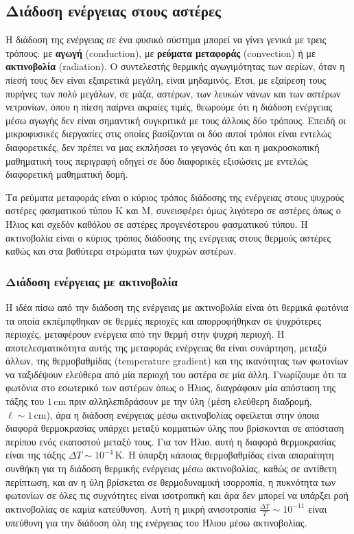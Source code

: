 \subsection{Διάδοση ενέργειας στους αστέρες}
Η διάδοση της ενέργειας σε ένα φυσικό σύστημα μπορεί να γίνει γενικά με τρεις τρόπους: με \textbf{αγωγή} (conduction), με \textbf{ρεύματα μεταφοράς} (convection) ή με \textbf{ακτινοβολία} (radiation). Ο συντελεστής θερμικής αγωγιμότητας των αερίων, όταν η πίεσή τους δεν είναι εξαιρετικά μεγάλη, είναι μηδαμινός. Έτσι, με εξαίρεση τους πυρήνες των πολύ μεγάλων, σε μάζα, αστέρων, των λευκών νάνων και των αστέρων νετρονίων, όπου η πίεση παίρνει ακραίες τιμές, θεωρούμε ότι η διάδοση ενέργειας μέσω αγωγής δεν είναι σημαντική συγκριτικά με τους άλλους δύο τρόπους. Επειδή οι μικροφυσικές διεργασίες στις οποίες βασίζονται οι δύο αυτοί τρόποι είναι εντελώς διαφορετικές, δεν πρέπει να μας εκπλήσσει το γεγονός ότι και η μακροσκοπική μαθηματική τους περιγραφή οδηγεί σε δύο διαφορικές εξισώσεις με εντελώς διαφορετική μαθηματική δομή.

Τα ρεύματα μεταφοράς είναι ο κύριος τρόπος διάδοσης της ενέργειας στους ψυχρούς αστέρες φασματικού τύπου Κ και Μ, συνεισφέρει όμως λιγότερο σε αστέρες όπως ο Ήλιος και σχεδόν καθόλου σε αστέρες προγενέστερου φασματικού τύπου. Η ακτινοβολία είναι ο κύριος τρόπος διάδοσης της ενέργειας στους θερμούς αστέρες καθώς και στα βαθύτερα στρώματα των ψυχρών αστέρων.
\subsubsection{Διάδοση ενέργειας με ακτινοβολία}
Η ιδέα πίσω από την διάδοση της ενέργειας με ακτινοβολία είναι ότι θερμικά φωτόνια τα οποία εκπέμπφθηκαν σε θερμές περιοχές και απορροφήθηκαν σε ψυχρότερες περιοχές, μεταφέρουν ενέργεια από την θερμή στην ψυχρή περιοχή. Η αποτελεσματικότητα αυτής της μεταφοράς ενέργειας θα είναι συνάρτηση, μεταξύ άλλων, της θερμοβαθμίδας (temperature gradient) και της ικανότητας των φωτονίων να ταξιδέψουν ελεύθερα από μία περιοχή του αστέρα σε μία άλλη. Γνωρίζουμε ότι τα φωτόνια στο εσωτερικό των αστέρων όπως ο Ήλιος, διαγράφουν μία απόσταση της τάξης του $1 \,\text{cm}$ πριν αλληλεπιδράσουν με την ύλη (μέση ελεύθερη διαδρομή, $\ell \sim 1 \,\text{cm}$), άρα η διάδοση ενέργειας μέσω ακτινοβολίας οφείλεται στην όποια διαφορά θερμοκρασίας υπάρχει μεταξύ κομματιών ύλης που βρίσκονται σε απόσταση περίπου ενός εκατοστού μεταξύ τους. Για τον Ήλιο, αυτή η διαφορά θερμοκρασίας είναι της τάξης $\Delta T \sim 10^{-4} \,\text{K}$. Η ύπαρξη κάποιας θερμοβαθμίδας είναι απαραίτητη συνθήκη για τη διάδοση θερμικής ενέργειας μέσω ακτινοβολίας, καθώς σε αντίθετη περίπτωση, και αν η ύλη βρίσκεται σε θερμοδυναμική ισορροπία, η πυκνότητα των φωτονίων σε όλες τις συχνότητες είναι ισοτροπική και άρα δεν μπορεί να υπάρξει ροή ακτινοβολίας σε καμία κατεύθυνση. Αυτή η μικρή ανισοτροπία $\frac{\Delta T}{T} \sim 10^{-11}$ είναι υπεύθυνη για την διάδοση όλη της ενέργειας του Ήλιου μέσω ακτινοβολίας.

